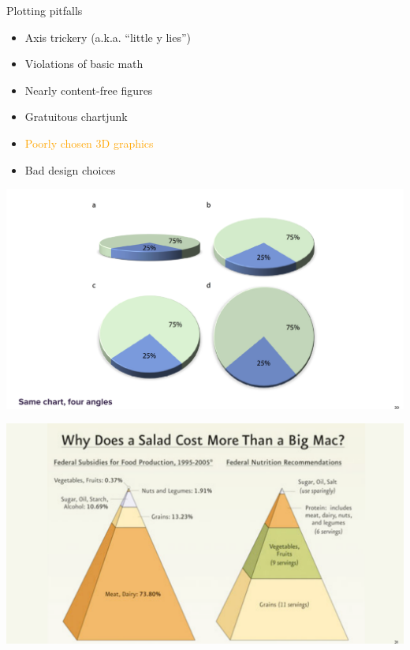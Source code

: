 \documentclass[
  ignorenonframetext,
]{beamer}
\providecommand{\tightlist}{%
  \setlength{\itemsep}{0pt}\setlength{\parskip}{0pt}}
\begin{document}
\begin{frame}{Plotting pitfalls}
\protect\hypertarget{plotting-pitfalls-4}{}
\begin{itemize}
\tightlist
\item
  Axis trickery (a.k.a. ``little y lies'')
\item
  Violations of basic math
\item
  Nearly content-free figures
\item
  Gratuitous chartjunk
\item
  \textcolor{orange}{Poorly chosen 3D graphics}
\item
  Bad design choices
\end{itemize}
\end{frame}

\begin{frame}{}
\protect\hypertarget{section-19}{}
\includegraphics{hallofshame_figs/fig_29.png}
\end{frame}

\begin{frame}{}
\protect\hypertarget{section-20}{}
\includegraphics{hallofshame_figs/fig_30.png}
\end{frame}
\end{document}
